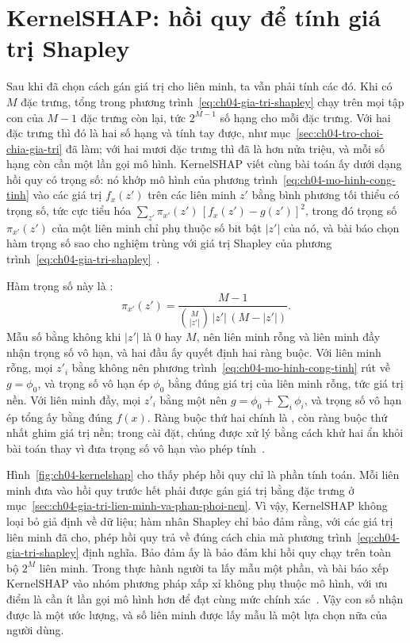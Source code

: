 \section{KernelSHAP: hồi quy để tính giá trị Shapley}
\label{sec:ch04-kernelshap}

%
Sau khi đã chọn cách gán giá trị cho liên minh, ta vẫn phải tính các
 đó. Khi có $M$ đặc trưng, tổng trong
phương trình~\ref{eq:ch04-gia-tri-shapley} chạy trên mọi tập con của $M-1$ đặc
trưng còn lại, tức $2^{M-1}$ số hạng cho mỗi đặc trưng. Với hai đặc trưng thì
đó là hai số hạng và tính tay được, như mục~\ref{sec:ch04-tro-choi-chia-gia-tri}
đã làm; với hai mươi đặc trưng thì đã là hơn nửa triệu, và mỗi số hạng còn cần
một lần gọi mô hình. KernelSHAP viết cùng bài toán ấy dưới dạng hồi quy có trọng số: nó
khớp mô hình của phương trình~\ref{eq:ch04-mo-hinh-cong-tinh} vào các giá trị
$f_x(z')$ trên các liên minh $z'$ bằng bình phương tối thiểu có trọng số, tức
cực tiểu hóa $\sum_{z'}\pi_{x'}(z')\,[f_x(z')-g(z')]^2$, trong đó trọng số
$\pi_{x'}(z')$ của một liên minh chỉ phụ thuộc số bit bật $|z'|$ của nó, và
bài báo chọn hàm trọng số sao cho nghiệm trùng với giá trị Shapley của
phương trình~\ref{eq:ch04-gia-tri-shapley}~\autocite{p10shap}.

%
Hàm trọng số này là :
\begin{equation}
\label{eq:ch04-ham-nhan-shapley}
\pi_{x'}(z')=\frac{M-1}{\binom{M}{|z'|}\,|z'|\,(M-|z'|)}.
\end{equation}
Mẫu số bằng không khi $|z'|$ là $0$ hay $M$, nên liên minh rỗng và liên minh
đầy nhận trọng số vô hạn, và hai đầu ấy quyết định hai ràng buộc. Với liên
minh rỗng, mọi $z'_i$ bằng không nên phương trình~\ref{eq:ch04-mo-hinh-cong-tinh}
rút về $g=\phi_0$, và trọng số vô hạn ép $\phi_0$ bằng đúng giá trị của liên
minh rỗng, tức giá trị nền. Với liên minh đầy, mọi $z'_i$ bằng một nên
$g=\phi_0+\sum_i\phi_i$, và trọng số vô hạn ép tổng ấy bằng đúng $f(x)$. Ràng
buộc thứ hai chính là , còn ràng buộc
thứ nhất ghim giá trị nền; trong cài đặt, chúng được xử lý bằng cách khử hai
ẩn khỏi bài toán thay vì đưa trọng số vô hạn vào phép
tính~\autocite{p10shap}.

Hình~\ref{fig:ch04-kernelshap} cho thấy phép hồi quy chỉ là phần tính toán. Mỗi
liên minh đưa vào hồi quy trước hết phải được gán giá trị bằng
 đặc trưng ở
mục~\ref{sec:ch04-gia-tri-lien-minh-va-phan-phoi-nen}. Vì vậy,
KernelSHAP không loại bỏ giả định về dữ liệu; hàm nhân Shapley chỉ bảo đảm
rằng, với các giá trị liên minh đã cho, phép hồi quy trả về đúng cách chia mà
phương trình~\ref{eq:ch04-gia-tri-shapley} định nghĩa. Bảo đảm ấy là bảo đảm khi
hồi quy chạy trên toàn bộ $2^M$ liên minh. Trong thực hành người ta lấy mẫu một
phần, và bài báo xếp KernelSHAP vào nhóm phương pháp xấp xỉ không phụ thuộc mô
hình, với ưu điểm là cần ít lần gọi mô hình hơn để đạt cùng mức chính
xác~\autocite{p10shap}. Vậy con số nhận được là một ước lượng, và số liên minh
được lấy mẫu là một lựa chọn nữa của người dùng.


